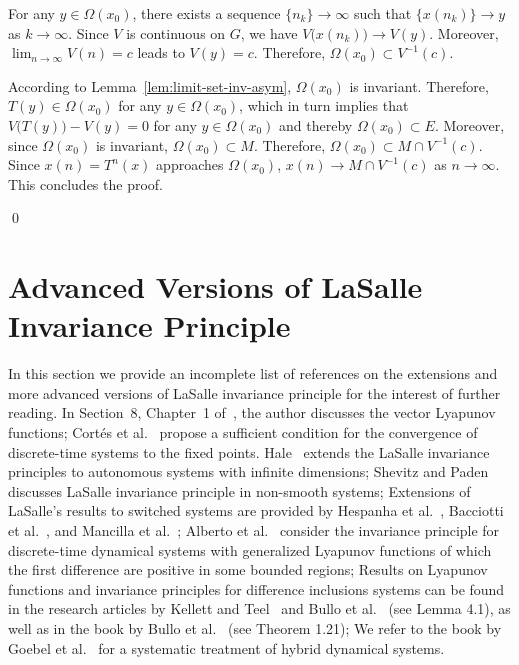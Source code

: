 \documentclass[10pt]{svmult}
\newcommand{\QED}{\begin{flushright}\qed \end{flushright}}
\begin{document}
For any $y\in \Omega(x_0)$, there exists a sequence $\{n_k\}\to \infty$ such that $\{x(n_k)\}\to y$ as $k\to \infty$. Since $V$ is continuous on $G$, we have $V\big( x(n_k) \big) \to V(y)$. Moreover, $\lim_{n\to \infty} V(n)=c$ leads to $V(y)=c$. Therefore, $\Omega(x_0)\subset V^{-1}(c)$.

According to Lemma~\ref{lem:limit-set-inv-asym}, $\Omega(x_0)$ is invariant. Therefore, $T(y)\in \Omega(x_0)$ for any $y\in \Omega(x_0)$, which in turn implies that $V\big( T(y) \big)-V(y)=0$ for any $y\in \Omega(x_0)$ and thereby $\Omega(x_0)\subset E$. Moreover, since $\Omega(x_0)$ is invariant, $\Omega(x_0)\subset M$. Therefore, $\Omega(x_0)\subset M\cap V^{-1}(c)$. Since $x(n)=T^n(x)$ approaches $\Omega(x_0)$, $x(n)\to M\cap V^{-1}(c)$ as $n\to \infty$. This concludes the proof.
\QED


\section{Advanced Versions of LaSalle Invariance Principle}
In this section we provide an incomplete list of references on the extensions and more advanced versions of LaSalle invariance principle for the interest of further reading. In Section~8, Chapter~1 of~\cite{JPL:76}, the author discusses the vector Lyapunov functions; Cort\'{e}s et al.~\cite{JC-SM-TK-FB:02j} propose a sufficient condition for the convergence of discrete-time systems to the fixed points. Hale~\cite{JKH:69-article} extends the LaSalle invariance principles to autonomous systems with infinite dimensions; Shevitz and Paden~\cite{DS-BP:94} discusses LaSalle invariance principle in non-smooth systems; Extensions of LaSalle's results to switched systems are provided by Hespanha et al.~\cite{JH-DL-DA-EDS:05}, Bacciotti et al.~\cite{AB-LM:05}, and Mancilla et al.~\cite{JLMA-RAG:06}; Alberto et al.~\cite{LFCA-TRC-ACPM:07} consider the invariance principle for discrete-time dynamical systems with generalized Lyapunov functions of which the first difference are positive in some bounded regions; Results on Lyapunov functions and invariance principles for difference inclusions systems can be found in the research articles by Kellett and Teel~\cite{CMK-ART:04} and Bullo et al.~\cite{FB-RC-PF:08u} (see Lemma 4.1), as well as in the book by Bullo et al.~\cite{FB-JC-SM:09} (see Theorem 1.21); We refer to the book by Goebel et al.~\cite{RG-RGS-ART:12} for a systematic treatment of hybrid dynamical systems.   








\end{document}

